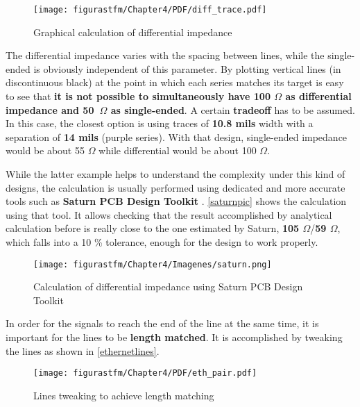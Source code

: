 \begin{figure} [H]
			\centering
			\texttt{[image: figurastfm/Chapter4/PDF/diff\_trace.pdf]}
			\caption{Graphical calculation of differential impedance} \label{difftrace}
			\vspace{-2cm}
\end{figure}

The differential impedance varies with the spacing between lines, while the single-ended is obviously independent of this parameter. By plotting vertical lines (in discontinuous black) at the point in which each series matches its target is easy to see that \textbf{it is not possible to simultaneously have 100 $\Omega$ as differential impedance and 50~$\Omega$ as single-ended}. A certain \textbf{tradeoff} has to be assumed. In this case, the closest option is using traces of \textbf{10.8 mils} width with a separation of \textbf{14 mils} (purple series). With that design, single-ended impedance would be about 55 $\Omega$ while differential would be about 100 $\Omega$. 

While the latter example helps to understand the complexity under this kind of designs, the calculation is usually performed using dedicated and more accurate tools such as \textbf{Saturn PCB Design Toolkit} \cite{saturn}. \autoref{saturnpic} shows the calculation using that tool. It allows checking that the result accomplished by analytical calculation before is really close to the one estimated by Saturn, \textbf{105 $\Omega$}/\textbf{59 $\Omega$}, which falls into a 10 \% tolerance, enough for the design to work properly.


\begin{figure} [H]
			\centering
			\texttt{[image: figurastfm/Chapter4/Imagenes/saturn.png]}
			\caption{Calculation of differential impedance using Saturn PCB Design Toolkit} \label{saturnpic}
			\vspace{-2cm}
\end{figure}

In order for the signals to reach the end of the line at the same time, it is important for the lines to be \textbf{length matched}. It is accomplished by tweaking the lines as shown in \autoref{ethernetlines}.

\begin{figure} [H]
			\centering
			\texttt{[image: figurastfm/Chapter4/PDF/eth\_pair.pdf]}
			\caption{Lines tweaking to achieve length matching} \label{ethernetlines}
\end{figure}

